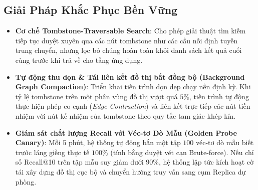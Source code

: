 \subsection{Giải Pháp Khắc Phục Bền Vững}
\begin{itemize}
  \item \textbf{Cơ chế Tombstone-Traversable Search}:
    Cho phép giải thuật tìm kiếm tiếp tục duyệt xuyên qua các nút tombstone như các cầu nối định tuyến trung chuyển, nhưng lọc bỏ chúng hoàn toàn khỏi danh sách kết quả cuối cùng trước khi trả về cho tầng ứng dụng.
  \item \textbf{Tự động thu dọn \& Tái liên kết đồ thị bất đồng bộ (Background Graph Compaction)}:
    Triển khai tiến trình dọn dẹp chạy nền định kỳ. Khi tỷ lệ tombstone trên một phân vùng đồ thị vượt quá $5\%$, tiến trình tự động thực hiện phép co cạnh (\textit{Edge Contraction}) và liên kết trực tiếp các nút tiền nhiệm với nút kế nhiệm của tombstone theo quy tắc tam giác khép kín.
  \item \textbf{Giám sát chất lượng Recall với Véc-tơ Dò Mẫu (Golden Probe Canary)}:
    Mỗi 5 phút, hệ thống tự động bắn một tập $100$ véc-tơ dò mẫu biết trước láng giềng thực tế $100\%$ (tính bằng duyệt vét cạn Brute-force). Nếu chỉ số Recall@10 trên tập mẫu suy giảm dưới $90\%$, hệ thống lập tức kích hoạt cờ tái xây dựng đồ thị cục bộ và chuyển hướng truy vấn sang cụm Replica dự phòng.
\end{itemize}
